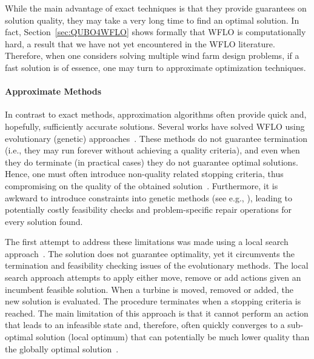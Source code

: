 \documentclass[preprint,12pt]{elsarticle}
\begin{document}
While the main advantage of exact techniques
is that they provide guarantees on solution quality, they may take a very long time to  find an optimal solution. 
In fact, Section~\ref{sec:QUBO4WFLO} shows formally that WFLO is computationally hard, a result
that we have not yet encountered in the WFLO literature. Therefore,
when one considers solving multiple wind farm design problems, if a fast solution is of essence,
one may turn to approximate optimization techniques.

\paragraph{Approximate Methods} In contrast to exact methods, approximation algorithms often provide   
quick and, hopefully, sufficiently accurate solutions. Several works have solved 
WFLO using evolutionary (genetic) approaches~\cite{MOSETTI1994105,gonzalez2010optimization,grady2005placement}. 
These methods do not guarantee termination 
(i.e., they may run forever without achieving a quality criteria), and even when they do terminate (in practical cases) they do
not guarantee optimal solutions. Hence, one must often
introduce non-quality related stopping criteria, 
thus compromising on the quality of the obtained solution~\cite{davis1991handbook}.
Furthermore, it is awkward to introduce constraints into genetic methods (see e.g., \cite{sorkhabi2018constrained}), leading to potentially costly feasibility checks and problem-specific repair operations for every solution found. 

The first attempt to address these limitations 
was made using a local search approach~\cite{ozturk2004heuristic}. 
The solution does not guarantee optimality, 
yet it circumvents the termination and feasibility checking issues of the evolutionary
methods. The local search approach attempts to apply either move, remove or add actions given an incumbent 
feasible solution. When a turbine is moved, removed or added, the new solution is evaluated. The procedure terminates 
when a stopping criteria is reached.
The main limitation of this approach 
is that it cannot perform an action 
that leads to an infeasible state and, therefore, often quickly converges to a sub-optimal solution (local optimum) 
that can potentially be much lower quality than the globally optimal solution~\cite{rivas2009solving}. 
\end{document}
